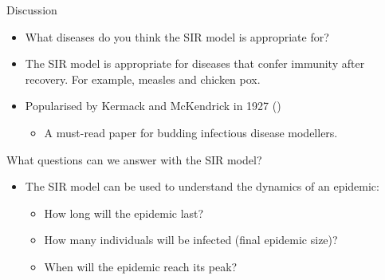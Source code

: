 \documentclass[
  ignorenonframetext,
]{beamer}
\providecommand{\tightlist}{%
  \setlength{\itemsep}{0pt}\setlength{\parskip}{0pt}}\usepackage{longtable,booktabs,array}
\begin{document}
\begin{frame}
\begin{block}{Discussion}
\label{discussion-2}
\begin{itemize}
\tightlist
\item
  What diseases do you think the SIR model is appropriate for?
\end{itemize}
\end{block}
\end{frame}

\begin{frame}
\begin{itemize}
\tightlist
\item
  The SIR model is appropriate for diseases that confer immunity after
  recovery. For example, measles and chicken pox.
\item
  Popularised by Kermack and McKendrick in 1927
  ()

  \begin{itemize}
  \tightlist
  \item
    A must-read paper for budding infectious disease modellers.
  \end{itemize}
\end{itemize}
\end{frame}

\begin{frame}
\begin{block}{What questions can we answer with the SIR model?}
\label{what-questions-can-we-answer-with-the-sir-model}
\begin{itemize}
\tightlist
\item
  The SIR model can be used to understand the dynamics of an epidemic:

  \begin{itemize}
  \tightlist
  \item
    How long will the epidemic last?
  \item
    How many individuals will be infected (final epidemic size)?
  \item
    When will the epidemic reach its peak?
  \end{itemize}
\end{itemize}
\end{block}
\end{frame}
\end{document}
